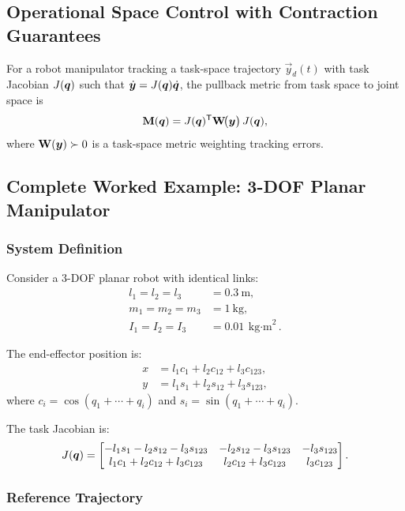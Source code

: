 \subsection{Operational Space Control with Contraction Guarantees}

For a robot manipulator tracking a task-space trajectory $\vec{y}_d(t)$ with task
Jacobian $J(\bm{q})$ such that $\dot{\bm{y}} = J(\bm{q})\dot{\bm{q}}$, the pullback metric from
task space to joint space is
\begin{equation}
\mathbf{M}(\bm{q}) = J(\bm{q})^{\mathsf{T}}\mathbf{W}\!\bigl(\bm{y}\bigr)\,J(\bm{q}),
\label{eq:ch8:pullback}
\end{equation}
where $\mathbf{W}(\bm{y})\succ 0$ is a task-space metric weighting tracking errors.

\subsection{Complete Worked Example: 3-DOF Planar Manipulator}

\subsubsection{System Definition}

Consider a 3-DOF planar robot with identical links:
\begin{align}
l_1 = l_2 = l_3 &= 0.3~\text{m}, \\
m_1 = m_2 = m_3 &= 1~\text{kg}, \\
I_1 = I_2 = I_3 &= 0.01~\text{kg$\cdot$m}^2.
\end{align}

The end-effector position is:
\begin{align}
x &= l_1 c_1 + l_2 c_{12} + l_3 c_{123}, \\
y &= l_1 s_1 + l_2 s_{12} + l_3 s_{123},
\end{align}
where $c_i = \cos(q_1 + \cdots + q_i)$ and $s_i = \sin(q_1 + \cdots + q_i)$.

The task Jacobian is:
\begin{equation}
J(\bm{q}) = \begin{bmatrix}
-l_1 s_1 - l_2 s_{12} - l_3 s_{123} & -l_2 s_{12} - l_3 s_{123} & -l_3 s_{123} \\
l_1 c_1 + l_2 c_{12} + l_3 c_{123} & l_2 c_{12} + l_3 c_{123} & l_3 c_{123}
\end{bmatrix}.
\label{eq:ch8:J-planar}
\end{equation}

\subsubsection{Reference Trajectory}

